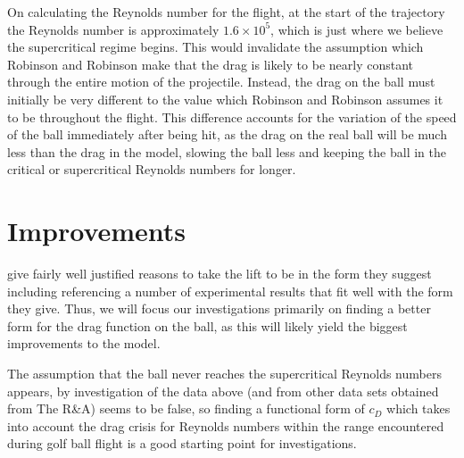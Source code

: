 On calculating the Reynolds number for the flight, at the start of the trajectory the Reynolds number
is approximately $1.6\times10^5$, which is just where we believe the supercritical regime begins. This
would invalidate the assumption which Robinson and Robinson make that the drag is likely to be nearly
constant through the entire motion of the projectile. Instead, the drag on the ball must initially be
very different to the value which Robinson and Robinson assumes it to be throughout the flight. This
difference accounts for the variation of the speed of the ball immediately after being hit, as the 
drag on the real ball will be much less than the drag in the model, slowing the ball less and keeping
the ball in the critical or supercritical Reynolds numbers for longer.


\section{Improvements}

\citet{Robinson2013} give fairly well justified reasons to take the lift to be in the form they suggest
including referencing a number of experimental results that fit well with the form they give. Thus,
we will focus our investigations primarily on finding a better form for the drag function on the ball,
as this will likely yield the biggest improvements to the model.

The assumption that the ball never reaches the supercritical Reynolds numbers appears, by investigation
of the data above (and from other data sets obtained from The R\&A) seems to be false, so finding a
functional form of $c_D$ which takes into account the drag crisis for Reynolds numbers within the
range encountered during golf ball flight is a good starting point for investigations.